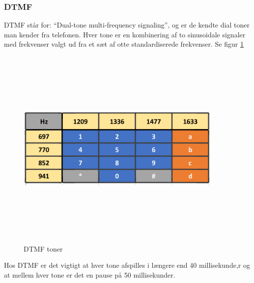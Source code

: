 \subsubsection{DTMF}
DTMF står for: “Dual-tone multi-frequency signaling”, og er de kendte dial toner man kender fra telefonen. Hver tone er en kombinering af to sinusoidale signaler med frekvenser valgt ud fra et sæt af otte standardiserede frekvenser. Se figur \ref{fig:dtmf}
\begin{figure}[ht]
	\centering
	\includegraphics[width=10cm,height=10cm,keepaspectratio]{pictures/DTMF.png}
	\caption{DTMF toner}
	\label{fig:dtmf}
\end{figure}
\newline
Hos DTMF er det vigtigt at hver tone afspilles i længere end 40 millisekunde,r og at mellem hver tone er det en pause på 50 millisekunder.

